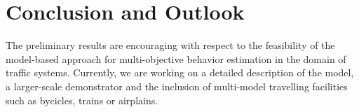 \documentclass[conference]{../cls/IEEEtran}
\begin{document}
\section{Conclusion and Outlook}

The preliminary results are encouraging with respect to the feasibility of the model-based approach for multi-objective behavior estimation in the domain of traffic systems.
Currently, we are working on a detailed description of the model, a larger-scale demonstrator and the inclusion of multi-model travelling facilities such as bycicles, trains or airplains.



\end{document}
